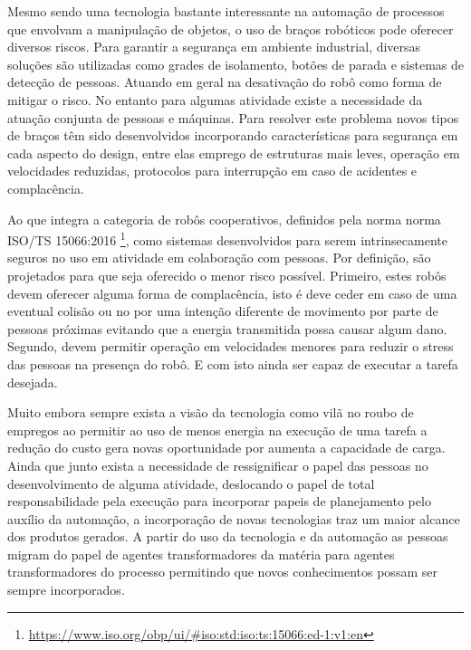 Mesmo sendo uma tecnologia bastante interessante na automação de processos que envolvam a manipulação de objetos, o uso de braços robóticos pode oferecer diversos riscos. Para garantir a segurança em ambiente industrial, diversas soluções são utilizadas como grades de isolamento, botões de parada e sistemas de detecção de pessoas. Atuando em geral na desativação do robô como forma de mitigar o risco.  No entanto para algumas atividade existe a necessidade da atuação conjunta de pessoas e máquinas. Para resolver este problema novos tipos de braços têm sido desenvolvidos incorporando características para segurança em cada aspecto do design, entre elas emprego de estruturas mais leves, operação em velocidades reduzidas, protocolos para interrupção em caso de acidentes e complacência.%

Ao que integra a categoria de robôs cooperativos, definidos pela norma  norma ISO/TS 15066:2016 \footnote{\url{https://www.iso.org/obp/ui/#iso:std:iso:ts:15066:ed-1:v1:en}}, como sistemas desenvolvidos para serem intrinsecamente seguros no uso em atividade em colaboração com pessoas. Por definição, são projetados para que seja oferecido o menor risco possível. Primeiro, estes robôs devem oferecer alguma forma de complacência, isto é deve ceder em caso de uma eventual colisão ou no por uma intenção diferente de movimento por parte de pessoas próximas evitando que a energia transmitida possa causar algum dano. Segundo, devem permitir operação em velocidades menores para reduzir o stress das pessoas na presença do robô. E com isto ainda ser capaz de executar a tarefa desejada. %

Muito embora sempre exista a visão da tecnologia como vilã no roubo de empregos ao permitir ao uso de menos energia na execução de uma tarefa a redução do custo gera novas oportunidade por aumenta a capacidade de carga. Ainda que junto exista a necessidade de ressignificar o papel das pessoas no desenvolvimento de alguma atividade, deslocando o papel de total responsabilidade pela execução para incorporar papeis de planejamento pelo auxílio da automação, a incorporação de novas tecnologias traz um maior alcance dos produtos gerados. A partir do uso da tecnologia e da automação as pessoas migram do papel de agentes transformadores da matéria para agentes transformadores do processo permitindo que novos conhecimentos possam ser sempre incorporados.


